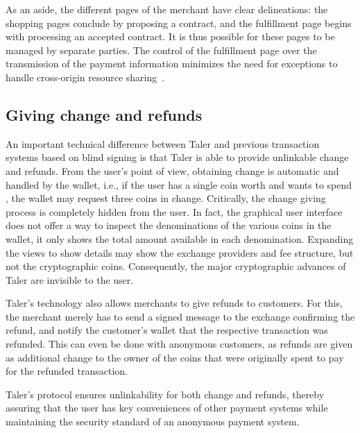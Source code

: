 \documentclass{IEEEtran}
\begin{document}
As an aside, the different pages of the merchant have clear
delineations: the shopping pages conclude by proposing a contract, and
the fulfillment page begins with processing an accepted contract.  It is thus
possible for these pages to be managed by separate parties. The
control of the fulfillment page over the transmission of the payment
information minimizes the need for exceptions to handle cross-origin
resource sharing~\cite{rfc6454,cors}.


\subsection{Giving change and refunds} %

An important technical difference between Taler and previous
transaction systems based on blind signing is that Taler is able to
provide unlinkable change and refunds.  From the user's point of view,
obtaining change is automatic and handled by the wallet, i.e., if the
user has a single coin worth  and wants to spend , the
wallet may request three  coins in change. Critically, the
change giving process is completely hidden from the user.
In fact, the graphical user
interface does not offer a way to inspect the denominations of the
various coins in the wallet, it only shows the total amount available
in each denomination.  Expanding the views to show details may show
the exchange providers and fee structure, but not the cryptographic
coins.  Consequently, the major cryptographic advances of Taler are
invisible to the user.

Taler's technology also allows merchants to give refunds to
customers. For this, the merchant merely has to send a signed
message to the exchange confirming the refund, and notify the
customer's wallet that the respective transaction was refunded.
This can even be done with anonymous customers, as refunds are
given as additional change to the owner of the coins that were
originally spent to pay for the refunded transaction.

Taler's protocol ensures unlinkability for both change and refunds,
thereby assuring that the user has key conveniences of other payment
systems while maintaining the security standard of an anonymous
payment system.
\end{document}
